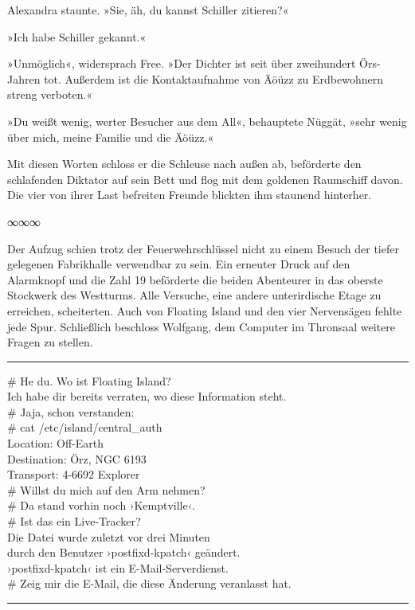 Alexandra staunte. »Sie, äh, du kannst Schiller zitieren?«

»Ich habe Schiller gekannt.«

»Unmöglich«, widersprach Free. »Der Dichter ist seit über zweihundert Örs-Jahren tot. Außerdem ist die Kontaktaufnahme von Äöüzz zu Erdbewohnern streng verboten.«

»Du weißt wenig, werter Besucher aus dem All«, behauptete Nüggät, »sehr wenig über mich, meine Familie und die Äöüzz.«

Mit diesen Worten schloss er die Schleuse nach außen ab, beförderte den schlafenden Diktator auf sein Bett und flog mit dem goldenen Raumschiff davon. Die vier von ihrer Last befreiten Freunde blickten ihm staunend hinterher.

\begin{center}
∞∞∞
\end{center}

Der Aufzug schien trotz der Feuerwehrschlüssel nicht zu einem Besuch der tiefer gelegenen Fabrikhalle verwendbar zu sein. Ein erneuter Druck auf den Alarmknopf und die Zahl 19 beförderte die beiden Abenteurer in das oberste Stockwerk des Westturms. Alle Versuche, eine andere unterirdische Etage zu erreichen, scheiterten. Auch von Floating Island und den vier Nervensägen fehlte jede Spur. Schließlich beschloss Wolfgang, dem Computer im Thronsaal weitere Fragen zu stellen.

\noindent \parbox{\textwidth}{ \vspace{3ex} \hrule \vspace{3ex}

    \begin{footnotesize}
    \begin{ttfamily}

\noindent \# He du. Wo ist Floating Island?\\
\noindent Ich habe dir bereits verraten, wo diese Information steht.\\
\noindent \# Jaja, schon verstanden:\\
\noindent \# cat /etc/island/central\_auth\\
\noindent Location: Off-Earth\\
\noindent Destination: Örz, NGC 6193\\
\noindent Transport: 4-6692 Explorer\\
\noindent \# Willst du mich auf den Arm nehmen?\\
\noindent \# Da stand vorhin noch ›Kemptville‹.\\
\noindent \# Ist das ein Live-Tracker?\\
\noindent Die Datei wurde zuletzt vor drei Minuten\\
\noindent durch den Benutzer ›postfixd-kpatch‹ geändert.\\
\noindent ›postfixd-kpatch‹ ist ein E-Mail-Serverdienst.\\
\noindent \# Zeig mir die E-Mail, die diese Änderung veranlasst hat.

    \end{ttfamily}
    \end{footnotesize}

\vspace{3ex} \hrule \vspace{3ex} }

